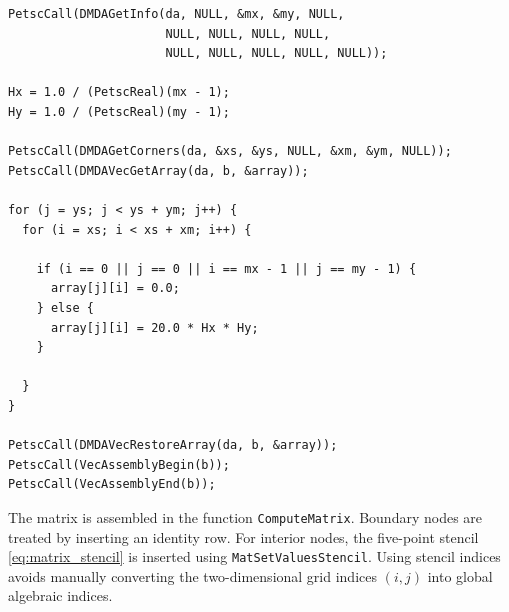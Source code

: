 \documentclass[unicode,10pt,a4paper,oneside,numbers=endperiod,openany]{scrartcl}
\begin{document}
\begin{lstlisting}[style=grayverbatim, caption={Assembly of the right-hand side vector}, label={lst:compute_rhs}]
PetscCall(DMDAGetInfo(da, NULL, &mx, &my, NULL,
                      NULL, NULL, NULL, NULL,
                      NULL, NULL, NULL, NULL, NULL));

Hx = 1.0 / (PetscReal)(mx - 1);
Hy = 1.0 / (PetscReal)(my - 1);

PetscCall(DMDAGetCorners(da, &xs, &ys, NULL, &xm, &ym, NULL));
PetscCall(DMDAVecGetArray(da, b, &array));

for (j = ys; j < ys + ym; j++) {
  for (i = xs; i < xs + xm; i++) {

    if (i == 0 || j == 0 || i == mx - 1 || j == my - 1) {
      array[j][i] = 0.0;
    } else {
      array[j][i] = 20.0 * Hx * Hy;
    }

  }
}

PetscCall(DMDAVecRestoreArray(da, b, &array));
PetscCall(VecAssemblyBegin(b));
PetscCall(VecAssemblyEnd(b));
\end{lstlisting}

The matrix is assembled in the function \texttt{ComputeMatrix}. Boundary nodes
are treated by inserting an identity row. For interior nodes, the five-point
stencil \eqref{eq:matrix_stencil} is inserted using \texttt{MatSetValuesStencil}.
Using stencil indices avoids manually converting the two-dimensional grid
indices \((i,j)\) into global algebraic indices.
\end{document}
